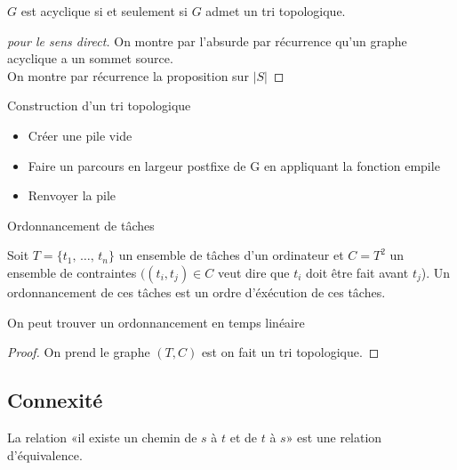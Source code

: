 \begin{proposition}
	$G$ est acyclique si et seulement si $G$ admet un tri topologique.
\end{proposition}

\begin{proof}[pour le sens direct]
	On montre par l'absurde par récurrence qu'un graphe acyclique a un sommet source.\\
	On montre par récurrence la proposition sur $|S|$
\end{proof}

\begin{algo}Construction d'un tri topologique
	\begin{itemize}[label=$\bullet$]
		\item Créer une pile vide
		\item Faire un parcours en largeur postfixe de G en appliquant la fonction empile
		\item Renvoyer la pile
	\end{itemize}
\end{algo}

\begin{appl}
	Ordonnancement de tâches
\end{appl}

\begin{definition}
	Soit $T=\{ t_1, \, \dots, \, t_n \}$ un ensemble de tâches d'un ordinateur et $C = T^2$ un ensemble de contraintes $((t_i, t_j) \in C$ veut dire que $t_i$ doit être fait avant $t_j$). Un ordonnancement de ces tâches est un ordre d'éxécution de ces tâches.
\end{definition}

\begin{proposition}
	On peut trouver un ordonnancement en temps linéaire
\end{proposition}

\begin{proof}
	On prend le graphe $(T, C)$ est on fait un tri topologique.
\end{proof}

\subsection{Connexité}

\begin{proposition}
	La relation «il existe un chemin de $s$ à $t$ et de $t$ à $s$» est une relation d'équivalence.
\end{proposition}

